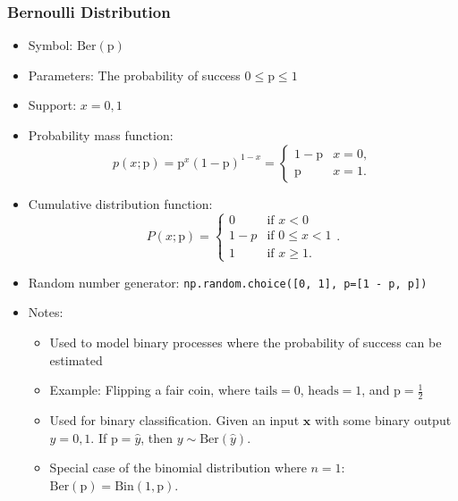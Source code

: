 \documentclass[
  letterpaper,
  DIV=11,
  numbers=noendperiod]{scrreprt}
\providecommand{\tightlist}{%
  \setlength{\itemsep}{0pt}\setlength{\parskip}{0pt}}\usepackage{longtable,booktabs,array}
\begin{document}
\hypertarget{bernoulli-distribution}{%
\subsubsection{Bernoulli Distribution}\label{bernoulli-distribution}}

\begin{itemize}
\tightlist
\item
  Symbol: \(\text{Ber}(\text{p})\)
\item
  Parameters: The probability of success \(0 \leq \text{p} \leq 1\)
\item
  Support: \(x=0,1\)
\item
  Probability mass function: \[
  p(x; \text{p}) = \text{p}^x (1-\text{p})^{1-x} = 
  \begin{cases}
  1-\text{p} & x = 0, \\
  \text{p} & x = 1.
  \end{cases}
  \]
\item
  Cumulative distribution function: \[
  P(x; \text{p}) = 
  \begin{cases} 
  0 & \text{if } x < 0 \\
  1-p & \text{if } 0 \leq x < 1 \\
  1 & \text{if } x \geq 1.
  \end{cases}.
  \]
\item
  Random number generator:
  \texttt{np.random.choice({[}0,\ 1{]},\ p={[}1\ -\ p,\ p{]})}
\item
  Notes:

  \begin{itemize}
  \tightlist
  \item
    Used to model binary processes where the probability of success can
    be estimated
  \item
    Example: Flipping a fair coin, where \(\text{tails} = 0\),
    \(\text{heads} = 1\), and \(\text{p}=\frac{1}{2}\)
  \item
    Used for binary classification. Given an input \(\mathbf{x}\) with
    some binary output \(y=0,1\). If \(\text{p}=\hat y\), then
    \(y \sim \text{Ber}(\hat y)\).
  \item
    Special case of the binomial distribution where \(n=1\):
    \(\text{Ber}(\text{p}) = \text{Bin}(1, \text{p})\).
  \end{itemize}
\end{itemize}
\end{document}
